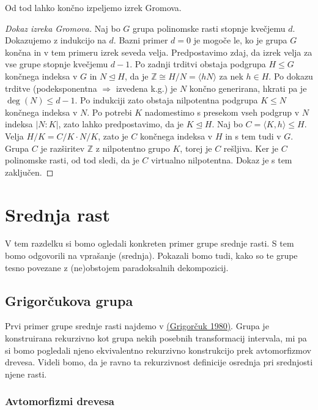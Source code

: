 \documentclass[11pt]{book}
\def\ZZ{\mathbb{Z}}
\def\vprasanje{\color{oranzna}}
\theoremstyle{definition}
\theoremstyle{zgled}
\theoremstyle{odprtproblem}
\theoremstyle{domacanaloga}
\newenvironment{dokaz}
    {\color{siva}\begin{proof}}
    {\end{proof}}
\theoremstyle{izrek}
\begin{document}
Od tod lahko končno izpeljemo izrek Gromova.

\begin{dokaz}[Dokaz izreka Gromova]
Naj bo $G$ grupa polinomske rasti stopnje kvečjemu $d$. Dokazujemo z indukcijo na $d$. Bazni primer $d = 0$ je mogoče le, ko je grupa $G$ končna in v tem primeru izrek seveda velja. Predpostavimo zdaj, da izrek velja za vse grupe stopnje kvečjemu $d-1$. Po zadnji trditvi obstaja podgrupa $H \leq G$ končnega indeksa v $G$ in $N \unlhd H$, da je $\ZZ \cong H/N = \langle hN \rangle$ za nek $h \in H$. Po dokazu trditve {\sc (podeksponentna $\Rightarrow$ izvedena k.g.)} je $N$ končno generirana, hkrati pa je $\deg(N) \leq d-1$. Po indukciji zato obstaja nilpotentna podgrupa $K \leq N$ končnega indeksa v $N$. Po potrebi $K$ nadomestimo s presekom vseh podgrup v $N$ indeksa $|N:K|$, zato lahko predpostavimo, da je $K \unlhd H$. Naj bo $C = \langle K, h \rangle \leq H$. Velja $H/K = C/K \cdot N/K$, zato je $C$ končnega indeksa v $H$ in s tem tudi v $G$. Grupa $C$ je razširitev $\ZZ$ z nilpotentno grupo $K$, torej je $C$ rešljiva. Ker je $C$ polinomske rasti, od tod sledi, da je $C$ virtualno nilpotentna. Dokaz je s tem zaključen.
\end{dokaz}

\chapter{Srednja rast}

V tem razdelku si bomo ogledali konkreten primer grupe srednje rasti. S tem bomo odgovorili na vprašanje {\sc \vprasanje (srednja)}. Pokazali bomo tudi, kako so te grupe tesno povezane z (ne)obstojem paradoksalnih dekompozicij.

\section{Grigorčukova grupa}

Prvi primer grupe srednje rasti najdemo v \href{http://www.mathnet.ru/links/7f1a24e826f4c70ec48d9c3a6dd9ef75/faa1772.pdf}{(Grigorčuk 1980)}. Grupa je konstruirana rekurzivno kot grupa nekih posebnih transformacij intervala, mi pa si bomo pogledali njeno ekvivalentno rekurzivno konstrukcijo prek avtomorfizmov drevesa. Videli bomo, da je ravno ta rekurzivnost definicije osrednja pri srednjosti njene rasti.

\subsection{Avtomorfizmi drevesa}
\end{document}
